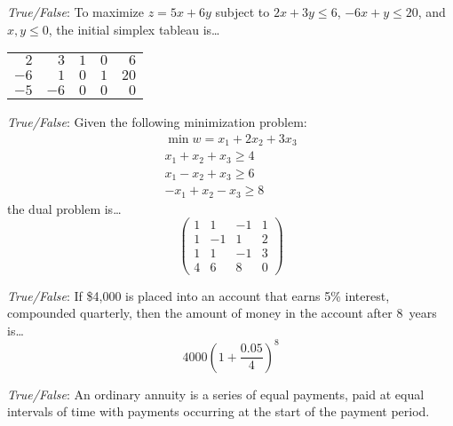 \documentclass[11pt,letterpaper]{article}
\begin{document}
\quizsol \textit{True/False}:
To maximize $z= 5x + 6y$ subject to $2x + 3y \leq 6$, $-6x + y \leq 20$, and $x, y \leq 0$, the initial simplex tableau is\dots
	\begin{center}
	\begin{tabular}{rrrr|r}
	$2$ & $3$ & $1$ & $0$ & $6$ \\
	$-6$ & $1$ & $0$ & $1$ & $20$ \\ \hline
	$-5$ & $-6$ & $0$ & $0$ & $0$
	\end{tabular}
	\end{center}

\quizsol \textit{True/False}:
Given the following minimization problem:
	\[
	\begin{aligned}
	\min w= x_1 + 2x_2 + 3x_3 \\
	x_1 + x_2 + x_3 \geq 4 \\
	x_1 - x_2 + x_3 \geq 6 \\
	-x_1 + x_2 - x_3 \geq 8
	\end{aligned}
	\]
the dual problem is\dots
	\[
	\begin{pmatrix}
	1 & 1 & -1 & 1 \\
	1 & -1 & 1 & 2 \\
	1 & 1 & -1 & 3 \\
	4 & 6 & 8 & 0 
	\end{pmatrix}
	\]

\quizsol \textit{True/False}:
If \$4,000 is placed into an account that earns 5\% interest, compounded quarterly, then the amount of money in the account after 8~years is\dots
	\[
	4000 \left(1 + \dfrac{0.05}{4} \right)^8
	\]

\quizsol \textit{True/False}: An ordinary annuity is a series of equal payments, paid at equal intervals of time with payments occurring at the start of the payment period.
\end{document}
